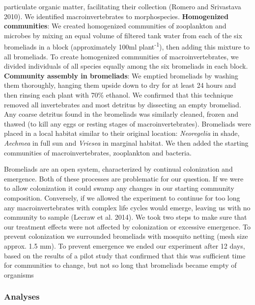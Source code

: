 \documentclass[12pt,]{article}
\begin{document}
particulate organic matter, facilitating their collection (Romero and
Srivastava 2010). We identified macroinvertebrates to morphospecies.
\textbf{Homogenized communities}: We created homogenized communities of
zooplankton and microbes by mixing an equal volume of filtered tank
water from each of the six bromeliads in a block (approximately 100ml
plant\textsuperscript{-1}), then adding this mixture to all bromeliads.
To create homogenized communities of macroinvertebrates, we divided
individuals of all species equally among the six bromeliads in each
block. \textbf{Community assembly in bromeliads}: We emptied bromeliads
by washing them thoroughly, hanging them upside down to dry for at least
24 hours and then rinsing each plant with 70\% ethanol. We confirmed
that this technique removed all invertebrates and most detritus by
dissecting an empty bromeliad. Any coarse detritus found in the
bromeliads was similarly cleaned, frozen and thawed (to kill any eggs or
resting stages of macroinvertebrates). Bromeliads were placed in a local
habitat similar to their original location: \emph{Neoregelia} in shade,
\emph{Aechmea} in full sun and \emph{Vriesea} in marginal habitat. We
then added the starting communities of macroinvertebrates, zooplankton
and bacteria.

Bromeliads are an open system, characterized by continual colonization
and emergence. Both of these processes are problematic for our question.
If we were to allow colonization it could swamp any changes in our
starting community composition. Conversely, if we allowed the experiment
to continue for too long any macroinvertebrates with complex life cycles
would emerge, leaving us with no community to sample (Lecraw et al.
2014). We took two steps to make sure that our treatment effects were
not affected by colonization or excessive emergence. To prevent
colonization we surrounded bromeliads with mosquito netting (mesh size
approx. 1.5 mm). To prevent emergence we ended our experiment after 12
days, based on the results of a pilot study that confirmed that this was
sufficient time for communities to change, but not so long that
bromeliads became empty of organisms

\subsubsection{Analyses}\label{analyses}
\end{document}
